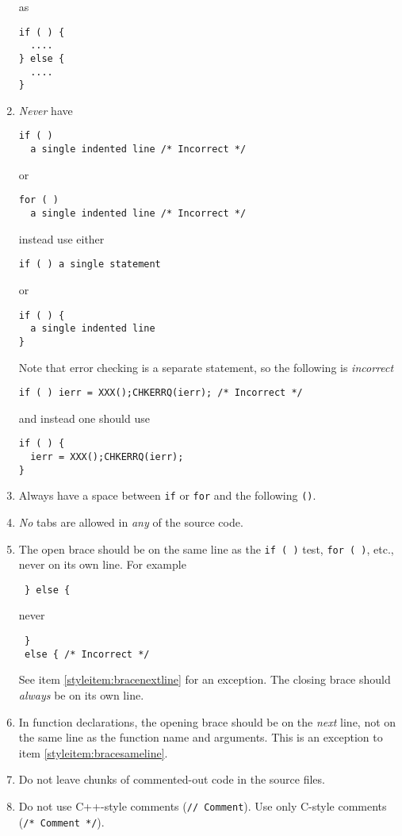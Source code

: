 \begin{enumerate}
as
\begin{lstlisting}
if ( ) {
  ....
} else {
  ....
}
\end{lstlisting}
\item {\em Never} have
\begin{lstlisting}
if ( ) 
  a single indented line /* Incorrect */
\end{lstlisting}
or
\begin{lstlisting}
for ( ) 
  a single indented line /* Incorrect */
\end{lstlisting}
instead use either
\begin{lstlisting}
if ( ) a single statement
\end{lstlisting}
or
\begin{lstlisting}
if ( ) {
  a single indented line
}
\end{lstlisting}
Note that error checking is a separate statement, so the following is {\em incorrect}
\begin{lstlisting}
if ( ) ierr = XXX();CHKERRQ(ierr); /* Incorrect */
\end{lstlisting}
and instead one should use
\begin{lstlisting}
if ( ) {
  ierr = XXX();CHKERRQ(ierr);
}
\end{lstlisting}
\item Always have a space between \lstinline{if} or \lstinline{for} and the following \lstinline{()}.
\item {\em No} tabs are allowed in {\em any} of the source code.
\item \label{styleitem:bracesameline} The open brace should be on the same line as the \lstinline{if ( )} test, \lstinline{for ( )}, etc., never on its own line.  For example
\begin{lstlisting}
 } else {
\end{lstlisting}
never
\begin{lstlisting}
 }
 else { /* Incorrect */
\end{lstlisting}
See item \ref{styleitem:bracenextline} for an exception.
 The closing brace should {\em always} be on its own line.
\item \label{styleitem:bracenextline} In function declarations, the opening brace should be on the {\em next} line, not on the same line as the function name and arguments. 
  This is an exception to item \ref{styleitem:bracesameline}. 
\item Do not leave chunks of commented-out code in the source files.
\item Do not use C++-style comments (\lstinline{// Comment}). Use only C-style comments (\lstinline{/* Comment */}).

\end{enumerate}
